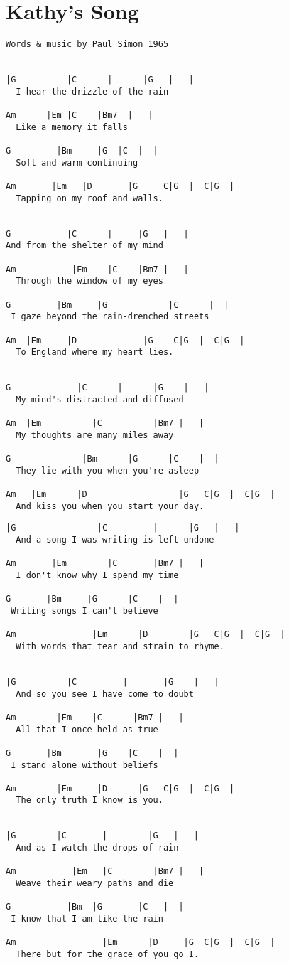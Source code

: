 \documentclass[leqno]{memoir}
\begin{document}
\chapter{Kathy's Song}
\begin{verbatim}
Words & music by Paul Simon 1965


|G          |C      |      |G   |   |
  I hear the drizzle of the rain

Am      |Em |C    |Bm7  |   |
  Like a memory it falls 

G         |Bm     |G  |C  |  |
  Soft and warm continuing 

Am       |Em   |D       |G     C|G  |  C|G  |
  Tapping on my roof and walls.


G           |C      |     |G   |   |
And from the shelter of my mind

Am           |Em    |C    |Bm7 |   |
  Through the window of my eyes

G         |Bm     |G            |C      |  |
 I gaze beyond the rain-drenched streets

Am  |Em     |D             |G    C|G  |  C|G  |
  To England where my heart lies.


G             |C      |      |G    |   |
  My mind's distracted and diffused

Am  |Em          |C          |Bm7 |   |
  My thoughts are many miles away

G              |Bm      |G      |C    |  |
  They lie with you when you're asleep

Am   |Em      |D                  |G   C|G  |  C|G  |
  And kiss you when you start your day.
\end{verbatim}
\newpage
\begin{verbatim}
|G                |C         |      |G   |   |
  And a song I was writing is left undone

Am       |Em        |C       |Bm7 |   |
  I don't know why I spend my time

G       |Bm     |G      |C    |  |
 Writing songs I can't believe

Am               |Em      |D        |G   C|G  |  C|G  |
  With words that tear and strain to rhyme.


|G          |C         |       |G    |   |
  And so you see I have come to doubt

Am        |Em    |C      |Bm7 |   |
  All that I once held as true

G       |Bm       |G    |C    |  |
 I stand alone without beliefs

Am        |Em     |D      |G   C|G  |  C|G  |
  The only truth I know is you.


|G        |C       |        |G   |   |
  And as I watch the drops of rain

Am           |Em   |C        |Bm7 |   |
  Weave their weary paths and die

G           |Bm  |G       |C   |  |
 I know that I am like the rain

Am                 |Em      |D     |G  C|G  |  C|G  |
  There but for the grace of you go I. 
\end{verbatim}
\newpage
\end{document}
